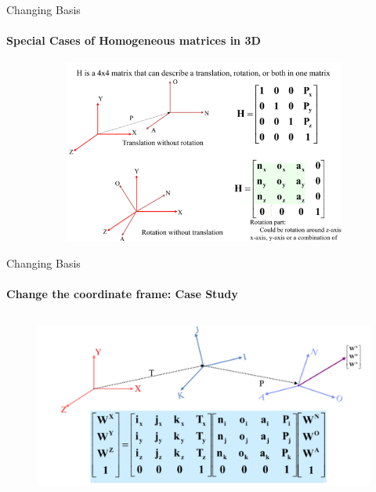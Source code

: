 \documentclass[aspectratio=169]{beamer}
\begin{document}
\begin{frame}[t]{Changing Basis}
    \framesubtitle{Special Cases of Homogeneous matrices in 3D}
    \vspace{-0.6cm}
    \begin{figure}[H]
        \centering\includegraphics[height=6cm,width=1\textwidth,keepaspectratio]{change_klimchik_3.png}
        \label{fig:change_klimchik_3.png}
    \end{figure}
\end{frame}

\begin{frame}[t]{Changing Basis}
    \framesubtitle{Change the coordinate frame: Case Study}
    \vspace{-0.6cm}
    \begin{figure}[H]
        \centering\includegraphics[height=6cm,width=1\textwidth,keepaspectratio]{change_klimchik_4.png}
        \label{fig:change_klimchik_4.png}
    \end{figure}
\end{frame}
\end{document}
